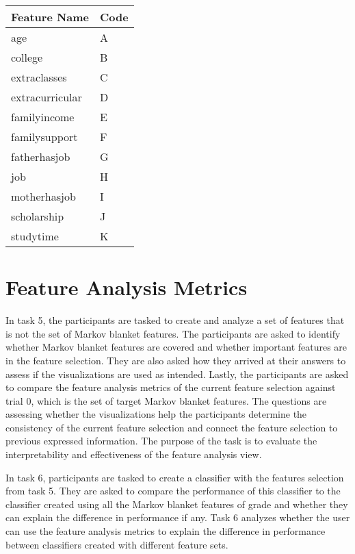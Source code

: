 \begin{table}[]
\center
\begin{tabular}{ll}
Feature Name    & Code \\ \hline
age             & A            \\
college         & B            \\
extraclasses    & C            \\
extracurricular & D            \\
familyincome    & E            \\
familysupport   & F            \\
fatherhasjob    & G            \\
job             & H            \\
motherhasjob    & I            \\
scholarship     & J            \\
studytime       & K
\end{tabular}
\caption{}
\label{FeatureToCode}
\end{table}

\section { Feature Analysis Metrics }
In task 5, the participants are tasked to create and analyze a set of features that is not the set of Markov blanket features. The participants are asked to identify whether Markov blanket features are covered and whether important features are in the feature selection. They are also asked how they arrived at their answers to assess if the visualizations are used as intended. Lastly, the participants are asked to compare the feature analysis metrics of the current feature selection against trial 0, which is the set of target Markov blanket features. The questions are assessing whether the visualizations help the participants determine the consistency of the current feature selection and connect the feature selection to previous expressed information. The purpose of the task is to evaluate the interpretability and effectiveness of the feature analysis view.

In task 6, participants are tasked to create a classifier with the features selection from task 5. They are asked to compare the performance of this classifier to the classifier created using all the Markov blanket features of grade and whether they can explain the difference in performance if any. Task 6 analyzes whether the user can use the feature analysis metrics to explain the difference in performance between classifiers created with different feature sets.

